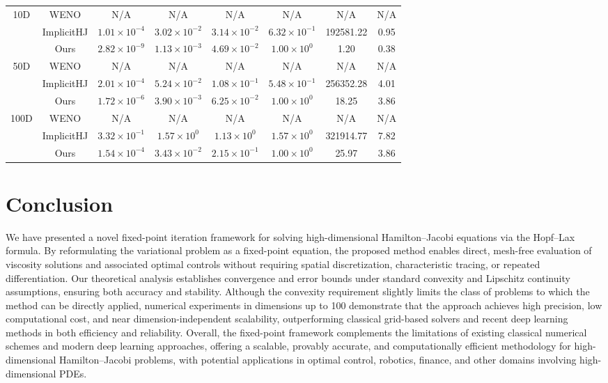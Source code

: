 \documentclass[review,hidelinks,onefignum,onetabnum]{siamart250106}
\begin{document}
\begin{table}[ht]
{\begin{tabular}{c|c|cccccc}
\hline
10D & WENO & N/A & N/A & N/A & N/A & N/A & N/A \\
    & ImplicitHJ & $1.01\times10^{-4}$ & $3.02\times10^{-2}$ & $3.14\times10^{-2}$ & $6.32\times10^{-1}$ & 192581.22 & 0.95 \\
    & Ours & $2.82\times10^{-9}$ & $1.13\times10^{-3}$ & $4.69\times10^{-2}$ & $1.00\times10^{0}$ & 1.20 & 0.38 \\
\hline
50D & WENO & N/A & N/A & N/A & N/A & N/A & N/A \\
    & ImplicitHJ & $2.01\times10^{-4}$ & $5.24\times10^{-2}$ & $1.08\times10^{-1}$ & $5.48\times10^{-1}$ & 256352.28 & 4.01 \\
    & Ours & $1.72\times10^{-6}$ & $3.90\times10^{-3}$ & $6.25\times10^{-2}$ & $1.00\times10^{0}$ & 18.25 & 3.86 \\
\hline
100D & WENO & N/A & N/A & N/A & N/A & N/A & N/A \\
     & ImplicitHJ & $3.32\times10^{-1}$ & $1.57\times10^{0}$ & $1.13\times10^{0}$ & $1.57\times10^{0}$ & 321914.77 & 7.82 \\
     & Ours & $1.54\times10^{-4}$ & $3.43\times10^{-2}$ & $2.15\times10^{-1}$ & $1.00\times10^{0}$ & 25.97 & 3.86 \\
\hline
\end{tabular}%
}
\end{table}



\section{Conclusion}

We have presented a novel fixed-point iteration framework for solving high-dimensional Hamilton--Jacobi equations via the Hopf--Lax formula. By reformulating the variational problem as a fixed-point equation, the proposed method enables direct, mesh-free evaluation of viscosity solutions and associated optimal controls without requiring spatial discretization, characteristic tracing, or repeated differentiation.
Our theoretical analysis establishes convergence and error bounds under standard convexity and Lipschitz continuity assumptions, ensuring both accuracy and stability. Although the convexity requirement slightly limits the class of problems to which the method can be directly applied, numerical experiments in dimensions up to 100 demonstrate that the approach achieves high precision, low computational cost, and near dimension-independent scalability, outperforming classical grid-based solvers and recent deep learning methods in both efficiency and reliability. Overall, the fixed-point framework complements the limitations of existing classical numerical schemes and modern deep learning approaches, offering a scalable, provably accurate, and computationally efficient methodology for high-dimensional Hamilton--Jacobi problems, with potential applications in optimal control, robotics, finance, and other domains involving high-dimensional PDEs.
\end{document}
